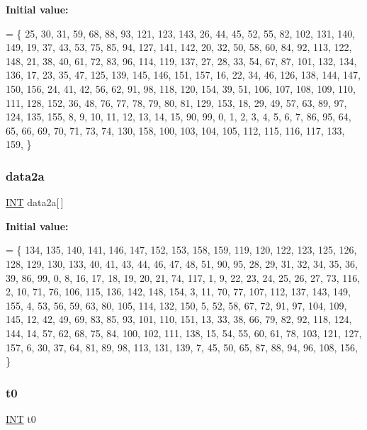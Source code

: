 {\bfseries Initial value\+:}
\begin{DoxyCode}
= \{
   25,  30,   31,   59,   68,   88,   93,  121,  123,  143, 
   26,  44,   45,   52,   55,   82,  102,  131,  140,  149, 
   19,  37,   43,   53,   75,   85,   94,  127,  141,  142, 
   20,  32,   50,   58,   60,   84,   92,  113,  122,  148, 
   21,  38,   40,   61,   72,   83,   96,  114,  119,  137, 
   27,  28,   33,   54,   67,   87,  101,  132,  134,  136, 
   17,  23,   35,   47,  125,  139,  145,  146,  151,  157, 
   16,  22,   34,   46,  126,  138,  144,  147,  150,  156, 
   24,  41,   42,   56,   62,   91,   98,  118,  120,  154, 
   39,  51,  106,  107,  108,  109,  110,  111,  128,  152, 
   36,  48,   76,   77,   78,   79,   80,   81,  129,  153, 
   18,  29,   49,   57,   63,   89,   97,  124,  135,  155, 
    8,   9,   10,   11,   12,   13,   14,   15,   90,   99, 
    0,   1,    2,    3,    4,    5,    6,    7,   86,   95, 
   64,  65,   66,   69,   70,   71,   73,   74,  130,  158, 
  100, 103,  104,  105,  112,  115,  116,  117,  133,  159, 
\}
\end{DoxyCode}
\mbox{\label{make__design_8_c_a9dae36bd8f703eed6fb1eabf9b606ca5}} 
\subsubsection{\texorpdfstring{data2a}{data2a}}
{\footnotesize\ttfamily \mbox{\hyperlink{galois_8h_a09fddde158a3a20bd2dcadb609de11dc}{I\+NT}} data2a\mbox{[}$\,$\mbox{]}}

{\bfseries Initial value\+:}
\begin{DoxyCode}
= \{
  134,  135,  140,  141,  146,  147,  152,  153,  158,  159, 
  119,  120,  122,  123,  125,  126,  128,  129,  130,  133, 
   40,   41,   43,   44,   46,   47,   48,   51,   90,   95, 
   28,   29,   31,   32,   34,   35,   36,   39,   86,   99, 
    0,    8,   16,   17,   18,   19,   20,   21,   74,  117, 
    1,    9,   22,   23,   24,   25,   26,   27,   73,  116, 
    2,   10,   71,   76,  106,  115,  136,  142,  148,  154, 
    3,   11,   70,   77,  107,  112,  137,  143,  149,  155, 
    4,   53,   56,   59,   63,   80,  105,  114,  132,  150, 
    5,   52,   58,   67,   72,   91,   97,  104,  109,  145, 
   12,   42,   49,   69,   83,   85,   93,  101,  110,  151, 
   13,   33,   38,   66,   79,   82,   92,  118,  124,  144, 
   14,   57,   62,   68,   75,   84,  100,  102,  111,  138, 
   15,   54,   55,   60,   61,   78,  103,  121,  127,  157, 
    6,   30,   37,   64,   81,   89,   98,  113,  131,  139, 
    7,   45,   50,   65,   87,   88,   94,   96,  108,  156, 
\}
\end{DoxyCode}
\mbox{\label{make__design_8_c_a4268f4fe222ffb119218a0199f5e1904}} 
\subsubsection{\texorpdfstring{t0}{t0}}
{\footnotesize\ttfamily \mbox{\hyperlink{galois_8h_a09fddde158a3a20bd2dcadb609de11dc}{I\+NT}} t0}


